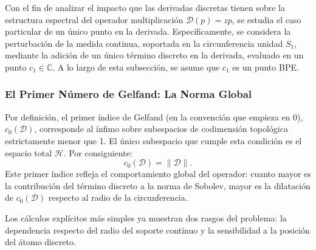 \documentclass[12pt,a4paper]{article}
\theoremstyle{definition}
\theoremstyle{remark}
\newcommand{\C}{\mathbb{C}}
\begin{document}
Con el fin de analizar el impacto que las derivadas discretas tienen sobre la estructura espectral del operador multiplicación $\mathcal{D}(p) = zp$, se estudia el caso particular de un único punto en la derivada. Específicamente, se considera la perturbación de la medida continua, soportada en la circunferencia unidad $S_1$, mediante la adición de un único término discreto en la derivada, evaluado en un punto $c_1 \in \C$. A lo largo de esta subsección, se asume que $c_1$ es un punto BPE.

\subsubsection{El Primer Número de Gelfand: La Norma Global}

Por definición, el primer índice de Gelfand (en la convención que empieza en $0$), $c_0(\mathcal{D})$, corresponde al ínfimo sobre subespacios de codimensión topológica estrictamente menor que 1. El único subespacio que cumple esta condición es el espacio total $\mathcal{H}$. Por consiguiente:
$$ c_0(\mathcal{D}) = \|\mathcal{D}\|. $$
Este primer índice refleja el comportamiento global del operador: cuanto mayor es la contribución del término discreto a la norma de Sobolev, mayor es la dilatación de $c_0(\mathcal{D})$ respecto al radio de la circunferencia.

Los cálculos explícitos más simples ya muestran dos rasgos del problema: la dependencia respecto del radio del soporte continuo y la sensibilidad a la posición del átomo discreto.
\end{document}
